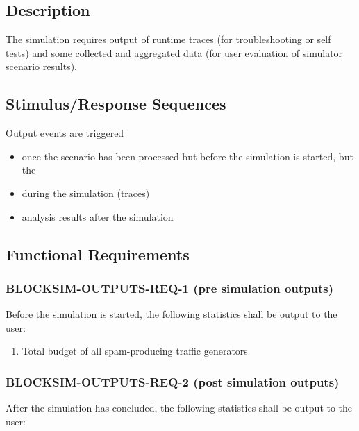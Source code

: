 \documentclass{scrreprt}
\begin{document}
    \subsection{Description}

      The simulation requires output of runtime traces (for troubleshooting or
      self tests) and some collected and aggregated data (for user evaluation
      of simulator scenario results).

    \subsection{Stimulus/Response Sequences}

      Output events are triggered

      \begin{itemize}
        \item once the scenario has been processed but before the
          simulation is started, but the
        \item during the simulation (traces)
        \item analysis results after the simulation
      \end{itemize}

    \subsection{Functional Requirements}

      \subsubsection{BLOCKSIM-OUTPUTS-REQ-1 (pre simulation outputs)}

        Before the simulation is started, the following statistics shall be
        output to the user:

        \begin{enumerate}
          \item Total budget of all spam-producing traffic generators
        \end{enumerate}

      \subsubsection{BLOCKSIM-OUTPUTS-REQ-2 (post simulation outputs)}

        After the simulation has concluded, the following statistics shall be
        output
        to the user:
\end{document}
